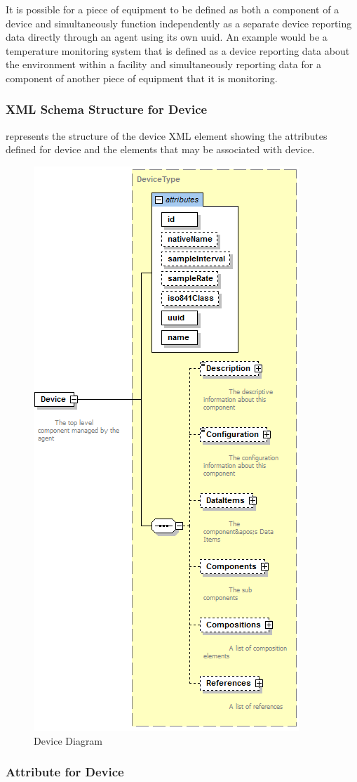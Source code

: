 \documentclass{mtconnect}	%
\begin{document}
It is possible for a piece of equipment to be defined as both a \gls{component} of a \gls{device} and simultaneously function independently as a separate \gls{device} reporting data directly through an \gls{agent} using its own \gls{uuid}.  An example would be a temperature monitoring system that is defined as a \gls{device} reporting data about the environment within a facility and simultaneously reporting data for a \gls{component} of another piece of equipment that it is monitoring. 

\subsubsection{XML Schema Structure for Device}

 represents the structure of the \gls{device} XML element showing the attributes defined for \gls{device} and the elements that may be associated with \gls{device}.

\begin{figure}[ht]
  \centering
  \includegraphics[width=.4\textwidth]{figures/device-schema-diagram.png}
  \caption{Device Diagram}
  \label{fig:device-schema-diagram}
\end{figure}

\FloatBarrier

\subsubsection{Attribute for Device}
\end{document}
